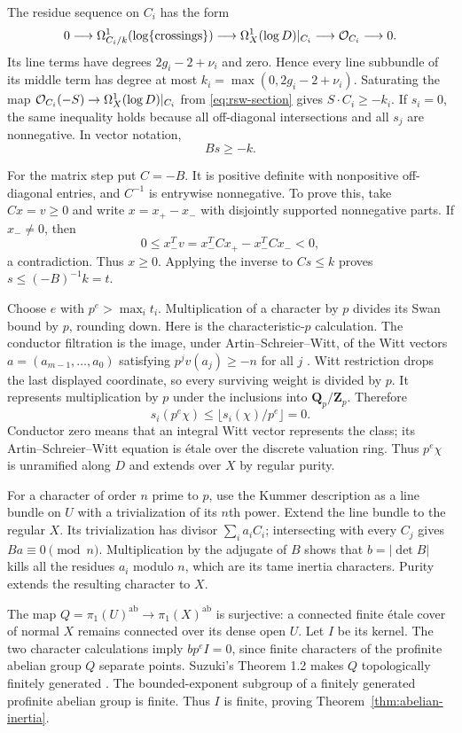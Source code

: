 The residue sequence on $C_i$ has the form
\[
 0\longrightarrow\Omega^1_{C_i/k}(\log\{\text{crossings}\})
 \longrightarrow\Omega_X^1(\log D)|_{C_i}
 \longrightarrow\mathcal O_{C_i}\longrightarrow0.
\]
Its line terms have degrees $2g_i-2+\nu_i$ and zero. Hence every line subbundle of its middle term has degree at most $k_i=\max(0,2g_i-2+\nu_i)$. Saturating the map $\mathcal O_{C_i}(-S)\to\Omega_X^1(\log D)|_{C_i}$ from \eqref{eq:rsw-section} gives $S\cdot C_i\geq-k_i$. If $s_i=0$, the same inequality holds because all off-diagonal intersections and all $s_j$ are nonnegative. In vector notation,
\[
 Bs\geq-k.
\]

For the matrix step put $C=-B$. It is positive definite with nonpositive off-diagonal entries, and $C^{-1}$ is entrywise nonnegative. To prove this, take $Cx=v\geq0$ and write $x=x_+-x_-$ with disjointly supported nonnegative parts. If $x_-\ne0$, then
\[
 0\leq x_-^Tv=x_-^TCx_+-x_-^TCx_-<0,
\]
a contradiction. Thus $x\geq0$. Applying the inverse to $Cs\leq k$ proves $s\leq(-B)^{-1}k=t$.

Choose $e$ with $p^e>\max_i t_i$. Multiplication of a character by $p$ divides its Swan bound by $p$, rounding down. Here is the characteristic-$p$ calculation. The conductor filtration is the image, under Artin--Schreier--Witt, of the Witt vectors $a=(a_{m-1},\ldots,a_0)$ satisfying $p^jv(a_j)\geq-n$ for all $j$ \cite[\S\S3.2.2--3.2.3, pp.~152--153]{KLS}. Witt restriction drops the last displayed coordinate, so every surviving weight is divided by $p$. It represents multiplication by $p$ under the inclusions into $\mathbf Q_p/\mathbf Z_p$. Therefore
\[
 s_i(p^e\chi)\leq\lfloor s_i(\chi)/p^e\rfloor=0.
\]
Conductor zero means that an integral Witt vector represents the class; its Artin--Schreier--Witt equation is \'etale over the discrete valuation ring. Thus $p^e\chi$ is unramified along $D$ and extends over $X$ by regular purity.

For a character of order $n$ prime to $p$, use the Kummer description as a line bundle on $U$ with a trivialization of its $n$th power. Extend the line bundle to the regular $X$. Its trivialization has divisor $\sum_i a_iC_i$; intersecting with every $C_j$ gives $Ba\equiv0\pmod n$. Multiplication by the adjugate of $B$ shows that $b=|\det B|$ kills all the residues $a_i$ modulo $n$, which are its tame inertia characters. Purity extends the resulting character to $X$.

The map $Q=\pi_1(U)^{\mathrm{ab}}\to\pi_1(X)^{\mathrm{ab}}$ is surjective: a connected finite \'etale cover of normal $X$ remains connected over its dense open $U$. Let $I$ be its kernel. The two character calculations imply $bp^eI=0$, since finite characters of the profinite abelian group $Q$ separate points. Suzuki's Theorem 1.2 makes $Q$ topologically finitely generated \cite[author p.~2]{Suzuki}. The bounded-exponent subgroup of a finitely generated profinite abelian group is finite. Thus $I$ is finite, proving Theorem~\ref{thm:abelian-inertia}.

